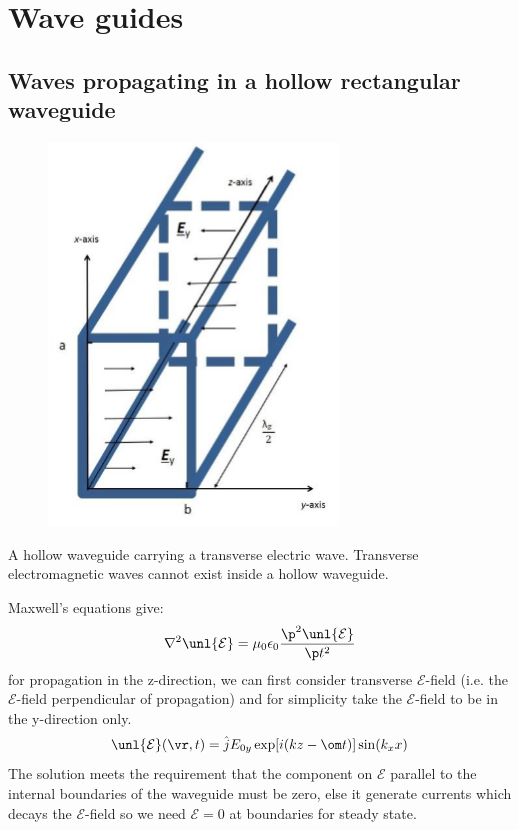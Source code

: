 \documentclass[a4paper, 11pt, normalem]{report}
\renewcommand\E{\mathcal{E}}
\newcommand\uE{\unl{\E}}
\newcommand\eno{\epsilon_0}
\begin{document}
\section{Wave guides}
\subsection{Waves propagating in a hollow rectangular waveguide}

\begin{figure}[H]
	\centering
	\includegraphics[scale=0.4]{box.png}
\end{figure}

A hollow waveguide carrying a transverse electric wave.
Transverse electromagnetic waves cannot exist inside a hollow waveguide.

Maxwell's equations give:
\begin{equation}
	\nabla^2\uE = \mu_0\eno\frac{\p^2\uE}{\p t^2}
\end{equation}
for propagation in the z-direction, we can first consider transverse $\E$-field (i.e. the $\E$-field perpendicular of propagation) and for simplicity take the $\E$-field to be in the y-direction only.
\begin{equation}
	\uE(\vr,t) = \hat{j}E_{0y}\exp[i(kz - \om t)]\sin(k_xx)
\end{equation}
The solution meets the requirement that the component on $\E$ parallel to the internal boundaries of the waveguide must be zero, else it generate currents which decays the $\E$-field so we need $\E = 0$ at boundaries for steady state.
\end{document}
